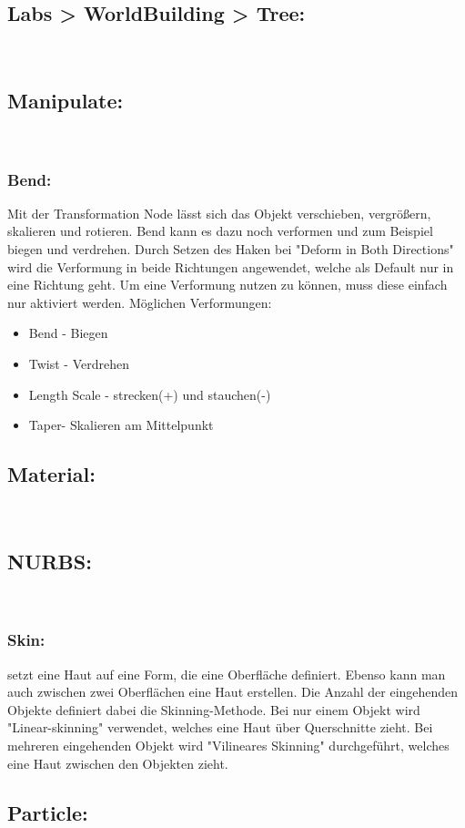 \subsection*{​Labs > WorldBuilding > Tree:}​
\subsection*{​Manipulate:}​
\subsubsection*{​Bend:}
Mit der Transformation Node lässt sich das Objekt verschieben, vergrößern, skalieren und rotieren. Bend kann es dazu noch verformen und zum Beispiel biegen und verdrehen. Durch Setzen des Haken bei "Deform in Both Directions" wird die Verformung in beide Richtungen angewendet, welche als Default nur in eine Richtung geht. Um eine Verformung nutzen zu können, muss diese einfach nur aktiviert werden.
Möglichen Verformungen:
\begin{itemize}
\item Bend - Biegen
\item Twist - Verdrehen
\item Length Scale - strecken(+) und stauchen(-)
\item Taper- Skalieren am Mittelpunkt
\end{itemize}

\subsection*{​Material:}​
\subsection*{​NURBS:}​
\subsubsection*{​Skin:}
setzt eine Haut auf eine Form, die eine Oberfläche definiert. Ebenso kann man auch zwischen zwei Oberflächen eine Haut erstellen. 
Die Anzahl der eingehenden Objekte definiert dabei die Skinning-Methode. Bei nur einem Objekt wird "Linear-skinning" verwendet, welches eine Haut über Querschnitte zieht. Bei mehreren eingehenden Objekt wird "Vilineares Skinning" durchgeführt, welches eine Haut zwischen den Objekten zieht.

\subsection*{​Particle:}​
